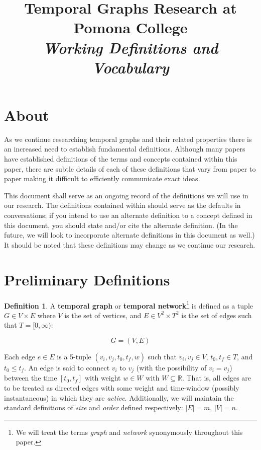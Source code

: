 \documentclass{article}
\theoremstyle{definition}
\newtheorem{defn}[thm]{Definition}
\numberwithin{thm}{subsection}
\begin{document}
\title{Temporal Graphs Research at Pomona College\\
  \textit{Working Definitions and Vocabulary}
}
\maketitle

\section{About}

As we continue researching temporal graphs and their related properties there is
an increased need to establish fundamental definitions. Although many papers
have established definitions of the terms and concepts contained within this
paper, there are subtle details of each of these definitions that vary from
paper to paper making it difficult to efficiently communicate exact ideas.

This document shall serve as an ongoing record of the definitions we will use
in our research. The definitions contained within should serve as the defaults
in conversations; if you intend to use an alternate definition to a concept
defined in this document, you should state and/or cite the alternate definition.
(In the future, we will look to incorporate alternate definitions in this
document as well.) It should be noted that these definitions may change as we
continue our research.

\section{Preliminary Definitions}

\begin{defn}
  A \textbf{temporal graph} or \textbf{temporal network}\footnote{We will treat
  the terms \textit{graph} and \textit{network} synonymously throughout this
  paper.} is defined as a tuple $G \in V \times E$ where $V$ is the set of
  vertices, and $E \in V^2 \times T^2$ is the set of edges such that
  $T = [0, \infty)$:

  \[ G = (V, E) \]

  Each edge $e \in E$ is a 5-tuple $(v_i, v_j, t_0, t_f, w)$ such that
  $v_i, v_j \in V$, $t_0, t_f \in T$, and $t_0 \leq t_f$. An edge is said to
  connect $v_i$ to $v_j$ (with the possibility of $v_i = v_j$) between the time
  $[t_0, t_f]$ with weight $w \in W$ with $W \subseteq \mathbb{R}$. That is, all
  edges are to be treated as directed edges with some weight and time-window
  (possibly instantaneous) in which they are \textit{active}. Additionally, we
  will maintain the standard definitions of \textit{size} and \textit{order}
  defined respectively: $|E| = m$,  $|V| = n$.
\end{defn}
\end{document}

